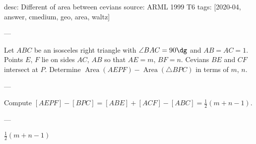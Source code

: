 desc: Different of area between cevians
source: ARML 1999 T6
tags: [2020-04, answer, cmedium, geo, area, waltz]

---

Let $ABC$ be an isosceles right triangle with $\angle BAC=90\dg$ and $AB=AC=1$. Points $E$, $F$ lie on sides $AC$, $AB$ so that $AE=m$, $BF=n$. Cevians $BE$ and $CF$ intersect at $P$. Determine $\operatorname{Area}(AEPF)-\operatorname{Area}(\triangle BPC)$ in terms of $m$, $n$.

---

Compute $[AEPF]-[BPC]=[ABE]+[ACF]-[ABC]=\tfrac12(m+n-1)$.

---

$\tfrac12(m+n-1)$
